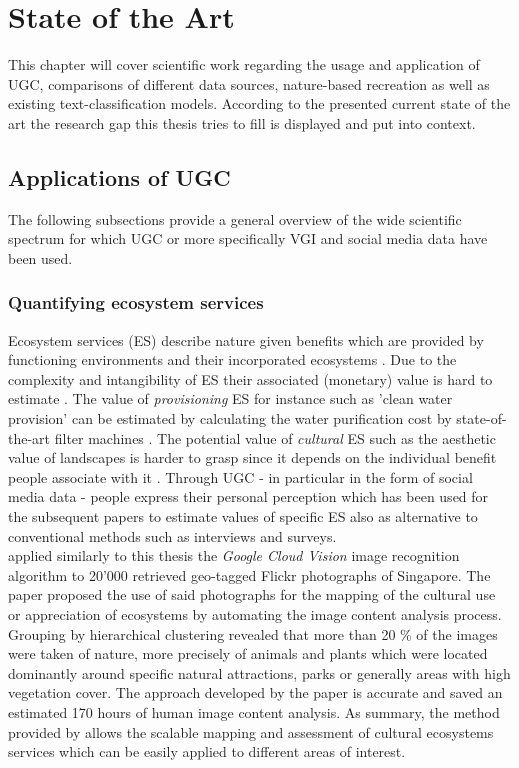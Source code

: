 \chapter{State of the Art} \label{state_of_the_art}
This chapter will cover scientific work regarding the usage and application of UGC, comparisons of different data sources, nature-based recreation as well as existing text-classification models. According to the presented current state of the art the research gap this thesis tries to fill is displayed and put into context.

\section{Applications of UGC} \label{applications_UGC}
The following subsections provide a general overview of the wide scientific spectrum for which UGC or more specifically VGI and social media data have been used.

\subsection{Quantifying ecosystem services}
Ecosystem services (ES) describe nature given benefits which are provided by functioning environments and their incorporated ecosystems \parencite{Jacobs2014}. Due to the complexity and intangibility of ES their associated (monetary) value is hard to estimate \parencite{ACostanza1997}. The value of \textit{provisioning} ES for instance such as 'clean water provision' can be estimated by calculating the water purification cost by state-of-the-art filter machines \parencite{Africa2018}. The potential value of \textit{cultural} ES such as the aesthetic value of landscapes is harder to grasp since it depends on the individual benefit people associate with it \parencite{Hunziker1995}. Through UGC - in particular in the form of social media data - people express their personal perception which has been used for the subsequent papers to estimate values of specific ES also as alternative to conventional methods such as interviews and surveys. \\

\textcite{Richards2018} applied similarly to this thesis the \textit{Google Cloud Vision} image recognition algorithm to 20'000 retrieved geo-tagged Flickr photographs of Singapore. The paper proposed the use of said photographs for the mapping of the cultural use or appreciation of ecosystems by automating the image content analysis process. Grouping by hierarchical clustering revealed that more than 20 \% of the images were taken of nature, more precisely of animals and plants which were located dominantly around specific natural attractions, parks or generally areas with high vegetation cover. The approach developed by the paper is accurate and saved an estimated 170 hours of human image content analysis. As summary, the method provided by \textcite{Richards2018} allows the scalable mapping and assessment of cultural ecosystems services which can be easily applied to different areas of interest. \\

